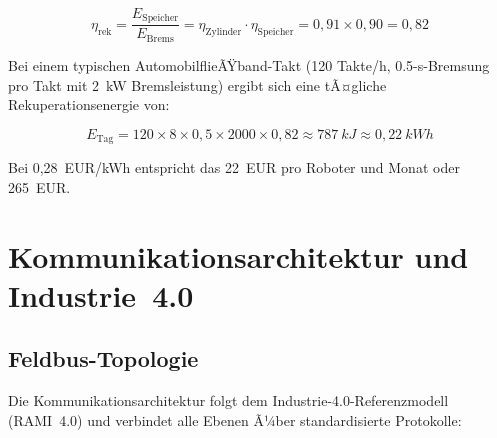 ﻿\documentclass[a4paper,12pt]{scrreprt}
\theoremstyle{definition}
\begin{document}
\begin{equation}
  \eta_{\text{rek}} = \frac{E_{\text{Speicher}}}{E_{\text{Brems}}}
  = \eta_{\text{Zylinder}} \cdot \eta_{\text{Speicher}}
  = 0{,}91 \times 0{,}90 = 0{,}82
\end{equation}

Bei einem typischen AutomobilflieÃŸband-Takt (120 Takte/h, 0.5-s-Bremsung
pro Takt mit \SI{2}{\kilo\watt} Bremsleistung) ergibt sich eine
tÃ¤gliche Rekuperationsenergie von:

\begin{equation}
  E_{\text{Tag}} = 120 \times 8 \times 0{,}5 \times 2000 \times 0{,}82
  \approx 787~kJ \approx 0{,}22~kWh
\end{equation}

Bei 0{,}28~EUR/kWh entspricht das
22~EUR pro Roboter und Monat oder 265~EUR.

\section{Kommunikationsarchitektur und Industrie~4.0}

\subsection{Feldbus-Topologie}

Die Kommunikationsarchitektur folgt dem Industrie-4.0-Referenzmodell
(RAMI~4.0) und verbindet alle Ebenen Ã¼ber standardisierte Protokolle:
\end{document}
